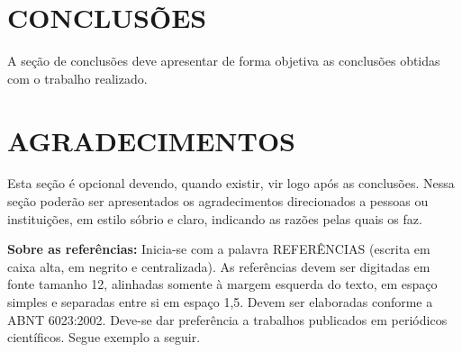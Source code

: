 \documentclass[brazil,12pt]{article}
\begin{document}
\section*{CONCLUSÕES}
A seção de conclusões deve apresentar de forma objetiva as conclusões
obtidas com o trabalho realizado.  

\section*{AGRADECIMENTOS}
Esta seção é opcional devendo, quando existir, vir logo após as
conclusões. Nessa seção poderão ser apresentados os agradecimentos
direcionados a pessoas ou instituições, em estilo sóbrio e claro,
indicando as razões pelas quais os faz.  


\textbf{Sobre as referências:} Inicia-se com a palavra REFERÊNCIAS
(escrita em caixa alta, em negrito e centralizada).  As referências
devem ser digitadas em fonte tamanho 12, alinhadas somente à margem
esquerda do texto, em espaço simples e separadas entre si em espaço
1,5. Devem ser elaboradas conforme a ABNT 6023:2002. Deve-se dar
preferência a trabalhos publicados em periódicos científicos. Segue
exemplo a seguir. 



\end{document}
